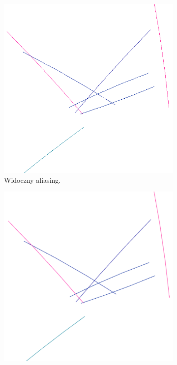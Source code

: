 \begin{figure}[H]
	\begin{subfigure}{0.5\textwidth}
		\centering
 		\includegraphics[width=\textwidth]{withAliasing.png}
    	\caption{Widoczny aliasing.}
 		\label{rys25}
	\end{subfigure}
	\hfill
	\begin{subfigure}{0.5\textwidth}
		\centering
		\includegraphics[width=\textwidth]{Antialiasing.png}

\end{subfigure}
\end{figure}
